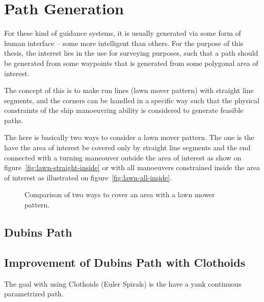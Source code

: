 \chapter{Path Generation}

For these kind of guidance systems, it is usually generated via some
form of human interface -- some more intelligent than others. For the
purpose of this thesis, the interest lies in the use for surveying
purposes, such that a path should be generated from some waypoints
that is generated from some polygonal area of interest.

The concept of this is to make run lines (lawn mover pattern) with
straight line segments, and the corners can be handled in a specific
way such that the physical constraints of the ship manoeuvring ability
is considered to generate feasible paths.

The here is basically two ways to consider a lawn mover pattern. The
one is the have the area of interest be covered only by straight line
segments and the end connected with a turning maneouver outside the
area of interest as show on figure~\vref{fig:lawn-straight-inside} or
with all manoeuvers constrained inside the area of interest as
illustrated on figure~\vref{fig:lawn-all-inside}.

\begin{figure}[htbp]
	\centering
	\qquad
	\caption{Comparison of two ways to cover an area with a lawn mower
	pattern.}
\end{figure}

\section{Dubins Path}



\section{Improvement of Dubins Path with Clothoids}
The goal with using Clothoids (Euler Spirals) is the have a yank
continuous parametrized path.

